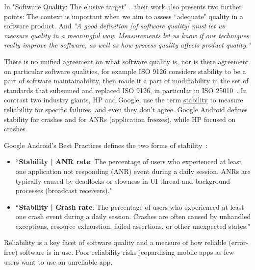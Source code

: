 In "Software Quality: The elusive target"~. their work also presents two further points: The context is important when we aim to assess ``adequate" quality in a software product. And \emph{"A good definition [of software quality] must let us measure quality in a meaningful way. Measurements let us know if our techniques really improve the software, as well as how process quality affects product quality."}


There is no unified agreement on what software quality is, nor is there agreement on particular software qualities, for example ISO 9126 considers stability to be a part of software maintainability, then made it a part of modifiability in the set of standards that subsumed and replaced ISO 9126, in particular in ISO 25010~. In contrast two industry giants, HP and Google, use the term \href{glossary-stability}{stability} to measure reliability for specific failures, and even they don't agree. Google Android defines stability for crashes and for ANRs (application freezes), while HP focused on crashes. 

Google Android's Best Practices defines the two forms of stability~:
\begin{itemize}
    \item ``\textbf{Stability | ANR rate}: The percentage of users who experienced at least one application not responding (ANR) event during a daily session. ANRs are typically caused by deadlocks or slowness in UI thread and background processes (broadcast receivers)."
    \item ``\textbf{Stability | Crash rate}: The percentage of users who experienced at least one crash event during a daily session. Crashes are often caused by unhandled exceptions, resource exhaustion, failed assertions, or other unexpected states."
\end{itemize}

Reliability is a key facet of software quality and a measure of how reliable (error-free) software is in use. Poor reliability risks jeopardising mobile apps as few users want to use an unreliable app. 

